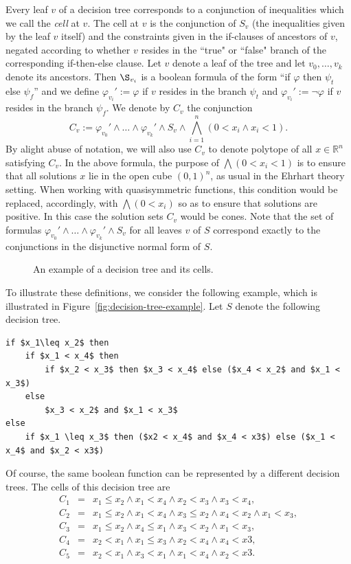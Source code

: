 \documentclass[12pt,reqno]{amsart}
\numberwithin{definition}{section}
\theoremstyle{definition}
\newcommand{\RR}{\mathbb{R}}
\begin{document}
Every leaf $v$ of a decision tree corresponds to a conjunction of inequalities which we call the \emph{cell} at $v$. The cell at $v$ is the conjunction of $S_v$ (the inequalities given by the leaf $v$ itself) and the constraints given in the if-clauses of ancestors of $v$, negated according to whether $v$ resides in the ``true" or ``false" branch of the corresponding if-then-else clause. Let $v$ denote a leaf of the tree and let $v_0,\ldots,v_k$ denote its ancestors. Then $\S_{v_i}$ is a boolean formula of the form ``if $\varphi$ then $\psi_t$ else $\psi_f$'' and we define $\varphi_{v_i}' := \varphi$ if $v$ resides in the branch $\psi_t$ and $\varphi_{v_i}' := \neg\varphi$ if $v$ resides in the branch $\psi_f$. We denote by $C_v$ the conjunction
\[
 C_v := \varphi_{v_0}'\wedge\ldots\wedge\varphi_{v_k}'\wedge S_v\wedge \bigwedge_{i=1}^n (0 < x_i \wedge x_i < 1).
\]
By alight abuse of notation, we will also use $C_v$ to denote polytope of all $x\in \RR^n$ satisfying $C_v$. In the above formula, the purpose of $\bigwedge (0 < x_i <1)$ is to ensure that all solutions $x$ lie in the open cube $(0,1)^n$, as usual in the Ehrhart theory setting. When working with quasisymmetric functions, this condition would be replaced, accordingly, with $\bigwedge (0 < x_i)$ so as to ensure that solutions are positive. In this case the solution sets $C_v$ would be cones. Note that the set of formulas $\varphi_{v_0}'\wedge\ldots\wedge\varphi_{v_k}'\wedge S_v$ for all leaves $v$ of $S$ correspond exactly to the conjunctions in the disjunctive normal form of $S$.

\begin{figure}[h]
\caption{An example of a decision tree and its cells.}
\label{fig:decision-tree-with-cells}
\end{figure}

To illustrate these definitions, we consider the following example, which is illustrated in Figure~\ref{fig:decision-tree-example}. Let $S$ denote the following decision tree.

\begin{lstlisting}[mathescape,basicstyle=\sffamily\small]
if $x_1\leq x_2$ then
    if $x_1 < x_4$ then
        if $x_2 < x_3$ then $x_3 < x_4$ else ($x_4 < x_2$ and $x_1 < x_3$)
    else
        $x_3 < x_2$ and $x_1 < x_3$
else
    if $x_1 \leq x_3$ then ($x2 < x_4$ and $x_4 < x3$) else ($x_1 < x_4$ and $x_2 < x3$)
\end{lstlisting}

Of course, the same boolean function can be represented by a different decision trees. The cells of this decision tree are
\begin{align*}
C_1 &=& x_1\leq x_2 \wedge x_1 < x_4 \wedge x_2 < x_3 \wedge x_3 < x_4, \\
C_2 &=& x_1\leq x_2 \wedge x_1 < x_4 \wedge x_3 \leq x_2 \wedge x_4 < x_2 \wedge x_1 < x_3, \\
C_3 &=& x_1\leq x_2 \wedge x_4 \leq x_1 \wedge x_3 < x_2 \wedge x_1 < x_3, \\
C_4 &=& x_2 < x_1 \wedge x_1 \leq x_3 \wedge x_2 < x_4 \wedge x_4 < x3, \\
C_5 &=& x_2 < x_1 \wedge x_3 < x_1 \wedge x_1 < x_4 \wedge x_2 < x3.
\end{align*}
\end{document}

